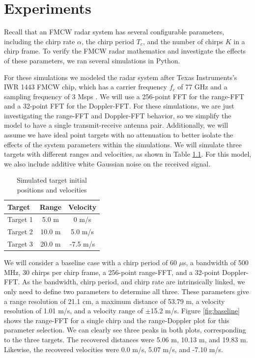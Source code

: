 \chapter{Experiments}
Recall that an FMCW radar system has several configurable parameters, including the
chirp rate $\alpha$, the chirp period $T_c$, and the number of chirps $K$ in a chirp
frame. To verify the FMCW radar mathematics and investigate
the effects of these parameters, we ran several simulations in Python.

For these simulations we modeled the radar system after Texas Instruments's
IWR 1443 FMCW chip, which has a carrier frequency $f_c$ of 77 GHz and a sampling
frequency of 3 Msps \cite{iwr1443datasheet}. We will use a 256-point FFT for the
range-FFT and a 32-point FFT for the Doppler-FFT. For these simulations, we are just investigating the
range-FFT and Doppler-FFT behavior, so we simplify the model to have a single
transmit-receive antenna pair. Additionally, we will assume we have ideal point
targets with no attenuation to better isolate the effects of the system
parameters within the simulations. We will simulate three targets with different
ranges and velocities, as shown in Table \ref{tab:targets}. For this
model, we also include additive white Gaussian noise on the received signal.

\begin{table}[h]
	\centering
	\caption{Simulated target initial positions and velocities}
	\begin{tabular}{l|c|c}
		Target & Range & Velocity \\
		\hline
		Target 1 & 5.0 m & 0 m/s \\
		Target 2 & 10.0 m & 5.0 m/s \\
		Target 3 & 20.0 m & -7.5 m/s 
	\end{tabular}
	\label{tab:targets}
\end{table}

We will consider a baseline case with a chirp period of 60 $\mu$s, a
bandwidth of 500 MHz, 30 chirps per chirp frame, a 256-point range-FFT,  and a
32-point Doppler-FFT. As the bandwidth, chirp period, and chirp rate are
intrinsically linked, we only need to define two parameters to determine all
three. These parameters give a range resolution of 21.1 cm, a maximum distance
of 53.79 m, a velocity resolution of 1.01 m/s, and a velocity range of $\pm$15.2
m/s. Figure \ref{fig:baseline} shows the range-FFT for a single chirp and the
range-Doppler plot for this parameter selection. We can clearly see three peaks
in both plots, corresponding to the three targets. The recovered distances were
5.06 m, 10.13 m, and 19.83 m. Likewise, the recovered velocities were 0.0 m/s,
5.07 m/s, and -7.10 m/s.

